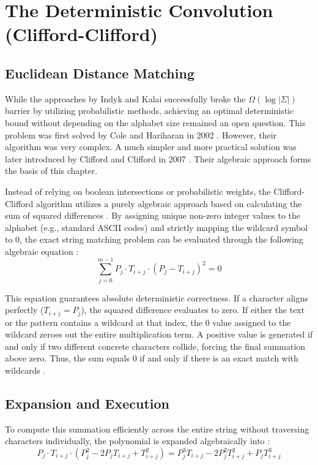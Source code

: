 \chapter{The Deterministic Convolution (Clifford-Clifford)}

\section{Euclidean Distance Matching}
While the approaches by Indyk and Kalai successfully broke the $\Omega(\log |\Sigma|)$ barrier by utilizing probabilistic methods, achieving an optimal deterministic bound without depending on the alphabet size remained an open question. This problem was first solved by Cole and Hariharan in 2002 \cite{cole2002}. However, their algorithm was very complex. A much simpler and more practical solution was later introduced by Clifford and Clifford in 2007 \cite{clifford2007}. Their algebraic approach forms the basis of this chapter.

Instead of relying on boolean intersections or probabilistic weights, the Clifford-Clifford algorithm utilizes a purely algebraic approach based on calculating the sum of squared differences \cite{clifford2007}. By assigning unique non-zero integer values to the alphabet (e.g., standard ASCII codes) and strictly mapping the wildcard symbol to $0$, the exact string matching problem can be evaluated through the following algebraic equation \cite{clifford2007}:
\begin{equation}
    \sum_{j=0}^{m-1} P_j \cdot T_{i+j} \cdot (P_j - T_{i+j})^2 = 0
\end{equation}

This equation guarantees absolute deterministic correctness. If a character aligns perfectly ($T_{i+j} = P_j$), the squared difference evaluates to zero. If either the text or the pattern contains a wildcard at that index, the $0$ value assigned to the wildcard zeroes out the entire multiplication term. A positive value is generated if and only if two different concrete characters collide, forcing the final summation above zero. Thus, the sum equals $0$ if and only if there is an exact match with wildcards \cite{clifford2007}.

\section{Expansion and Execution}
To compute this summation efficiently across the entire string without traversing characters individually, the polynomial is expanded algebraically into \cite{clifford2007}:
\begin{equation}
    P_j \cdot T_{i+j} \cdot (P_j^2 - 2 P_j T_{i+j} + T_{i+j}^2) = P_j^3 T_{i+j} - 2 P_j^2 T_{i+j}^2 + P_j T_{i+j}^3
\end{equation}

